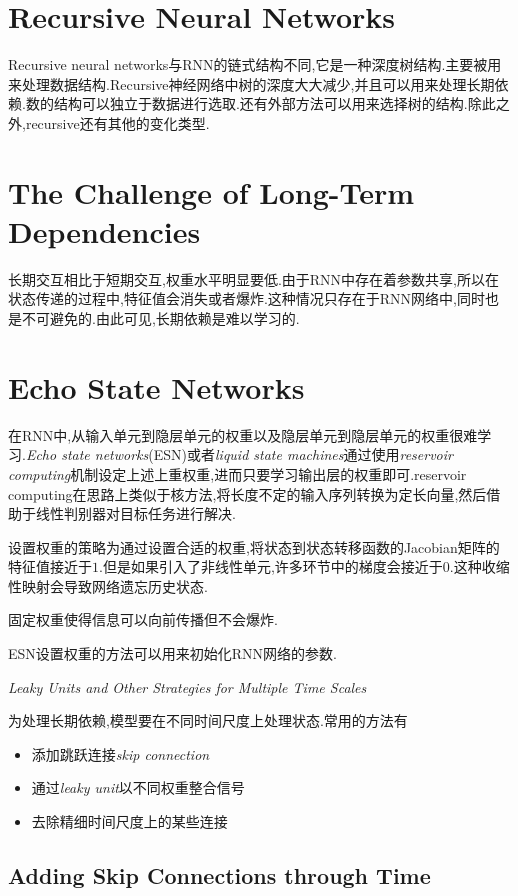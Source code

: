\section{Recursive Neural Networks}

Recursive neural networks与RNN的链式结构不同,它是一种深度树结构.主要被用来处理数据结构.Recursive神经网络中树的深度大大减少,并且可以用来处理长期依赖.数的结构可以独立于数据进行选取.还有外部方法可以用来选择树的结构.除此之外,recursive还有其他的变化类型.

\section{The Challenge of Long-Term Dependencies}

长期交互相比于短期交互,权重水平明显要低.由于RNN中存在着参数共享,所以在状态传递的过程中,特征值会消失或者爆炸.这种情况只存在于RNN网络中,同时也是不可避免的.由此可见,长期依赖是难以学习的.

\section{Echo State Networks}

在RNN中,从输入单元到隐层单元的权重以及隐层单元到隐层单元的权重很难学习.\textit{Echo state networks}(ESN)或者\textit{liquid state machines}通过使用\textit{reservoir computing}机制设定上述上重权重,进而只要学习输出层的权重即可.reservoir computing在思路上类似于核方法,将长度不定的输入序列转换为定长向量,然后借助于线性判别器对目标任务进行解决.

设置权重的策略为通过设置合适的权重,将状态到状态转移函数的Jacobian矩阵的特征值接近于$1$.但是如果引入了非线性单元,许多环节中的梯度会接近于$0$.这种收缩性映射会导致网络遗忘历史状态.

固定权重使得信息可以向前传播但不会爆炸.

ESN设置权重的方法可以用来初始化RNN网络的参数.

\textit{Leaky Units and Other Strategies for Multiple Time Scales}

为处理长期依赖,模型要在不同时间尺度上处理状态.常用的方法有
\begin{itemize}
    \item 添加跳跃连接\textit{skip connection}
    \item 通过\textit{leaky unit}以不同权重整合信号
    \item 去除精细时间尺度上的某些连接
\end{itemize}

\subsection{Adding Skip Connections through Time}

